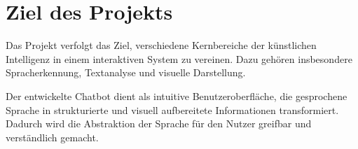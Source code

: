 \documentclass[a4paper,12pt]{article}
\begin{document}
\section{Ziel des Projekts}

Das Projekt verfolgt das Ziel, verschiedene Kernbereiche der künstlichen Intelligenz in einem interaktiven System zu vereinen. Dazu gehören insbesondere Spracherkennung, Textanalyse und visuelle Darstellung.

Der entwickelte Chatbot dient als intuitive Benutzeroberfläche, die gesprochene Sprache in strukturierte und visuell aufbereitete Informationen transformiert. Dadurch wird die Abstraktion der Sprache für den Nutzer greifbar und verständlich gemacht.
\end{document}
